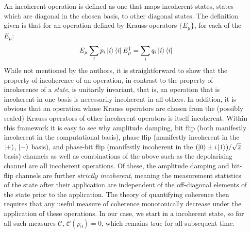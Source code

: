 \documentclass{report}
\begin{document}
\begin{appendices}
An incoherent operation is defined as one that maps incoherent states, states which are diagonal in the chosen basis, to other diagonal states. The definition given is that for an operation defined by Krauss operators $\{E_\mu\}$, for each of the $E_\mu$:
\begin{equation*}
    E_\mu \sum_i p_i \ket{i}\bra{i} E_\mu^\dag = \sum_i q_i \ket{i}\bra{i}
\end{equation*}
While not mentioned by the authors, it is straightforward to show that the property of incoherence of an operation, in contrast to the property of incoherence of a \textit{state}, is unitarily invariant, that is, an operation that is incoherent in one basis is necessarily incoherent in all others. In addition, it is obvious that an operation whose Krauss operators are chosen from the (possibly scaled) Krauss operators of other incoherent operators is itself incoherent. Within this framework it is easy to see why amplitude damping, bit flip (both manifestly incoherent in the computational basis), phase flip (manifestly incoherent in the $\ket{+}$, $\ket{-}$ basis), and phase-bit flip (manifestly incoherent in the $(\ket{0} \pm i\ket{1})/\sqrt{2}$ basis) channels as well as combinations of the above such as the depolarising channel are all incoherent operations. Of these, the amplitude damping and bit-flip channels are further \textit{strictly incoherent}, meaning the measurement statistics of the state after their application are independent of the off-diagonal elements of the state prior to the application. The theory of quantifying coherence then requires that any useful measure of coherence monotonically decrease under the application of these operations. In our case, we start in a incoherent state, so for all such measures $\mathcal{C}$, $\mathcal{C}(\rho_0) = 0$, which remains true for all subsequent time.


\end{appendices}
\end{document}
